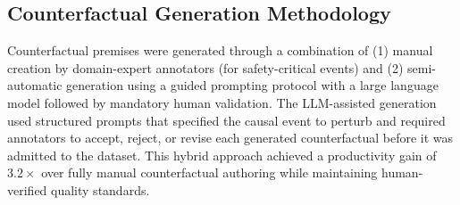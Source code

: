 \subsection{Counterfactual Generation Methodology}
\label{ssec:counterfactual_gen}

Counterfactual premises were generated through a combination of (1) manual creation
by domain-expert annotators (for safety-critical events) and (2) semi-automatic
generation using a guided prompting protocol with a large language model followed
by mandatory human validation. The LLM-assisted generation used structured prompts
that specified the causal event to perturb and required annotators to accept,
reject, or revise each generated counterfactual before it was admitted to the dataset.
This hybrid approach achieved a productivity gain of $3.2\times$ over fully manual
counterfactual authoring while maintaining human-verified quality standards.
